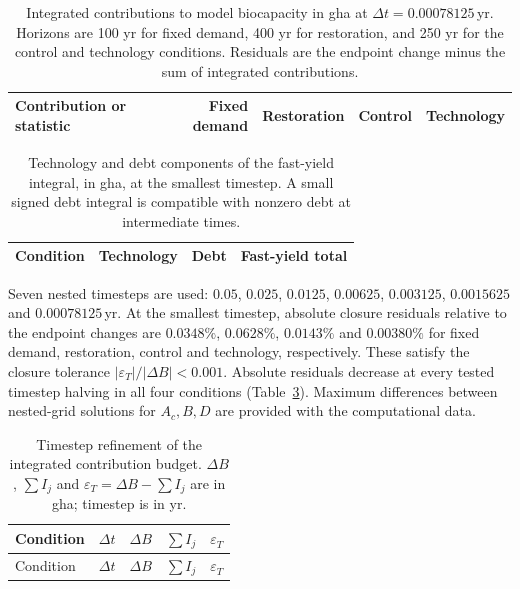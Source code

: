 \documentclass[11pt,a4paper]{article}
\begin{document}
\begin{table}[htbp]
\centering\small
\setlength{\tabcolsep}{4pt}
\caption{Integrated contributions to model biocapacity in gha at $\Delta t=0.00078125$\,yr. Horizons are 100 yr for fixed demand, 400 yr for restoration, and 250 yr for the control and technology conditions. Residuals are the endpoint change minus the sum of integrated contributions.}
\label{tab:si_c13budget}
\begin{tabular}{lrrrr}
\toprule
Contribution or statistic & Fixed demand & Restoration & Control & Technology \\
\midrule

\end{tabular}
\end{table}

\begin{table}[htbp]
\centering\small
\caption{Technology and debt components of the fast-yield integral, in gha, at the smallest timestep. A small signed debt integral is compatible with nonzero debt at intermediate times.}
\label{tab:si_c13split}
\begin{tabular}{lrrr}
\toprule
Condition & Technology & Debt & Fast-yield total \\
\midrule

\end{tabular}
\end{table}

Seven nested timesteps are used: $0.05$, $0.025$, $0.0125$, $0.00625$, $0.003125$, $0.0015625$ and $0.00078125$\,yr. At the smallest timestep, absolute closure residuals relative to the endpoint changes are $0.0348\%$, $0.0628\%$, $0.0143\%$ and $0.00380\%$ for fixed demand, restoration, control and technology, respectively. These satisfy the closure tolerance $|\varepsilon_T|/|\Delta B|<0.001$. Absolute residuals decrease at every tested timestep halving in all four conditions (Table~\ref{tab:si_c13refine}). Maximum differences between nested-grid solutions for $A_c,B,D$ are provided with the computational data.

\clearpage
{\small
\begin{longtable}{lrrrr}
\caption{Timestep refinement of the integrated contribution budget. $\Delta B$, $\sum I_j$ and $\varepsilon_T=\Delta B-\sum I_j$ are in gha; timestep is in yr.}\label{tab:si_c13refine}\\
\toprule
Condition & $\Delta t$ & $\Delta B$ & $\sum I_j$ & $\varepsilon_T$ \\
\midrule
\endfirsthead
\toprule
Condition & $\Delta t$ & $\Delta B$ & $\sum I_j$ & $\varepsilon_T$ \\
\midrule
\endhead

\end{longtable}
}
\end{document}
